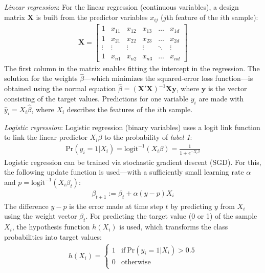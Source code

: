 \documentclass[a4paper,11pt]{article}
\begin{document}
\emph{Linear regression}: For the linear regression (continuous
variables), a design matrix $\mathbf{X}$ is built from the predictor
variables $x_{ij}$ ($j$th feature of the $i$th sample):
\begin{align}
\mathbf{X} = 
\begin{bmatrix}
    1 & x_{11} & x_{12} & x_{13} & \dots  & x_{1d} \\
    1 & x_{21} & x_{22} & x_{23} & \dots  & x_{2d} \\
    \vdots & \vdots & \vdots & \vdots & \ddots & \vdots \\
    1 & x_{n1} & x_{n2} & x_{n3} & \dots  & x_{nd}
\end{bmatrix}
\end{align}
The first column in the matrix enables fitting the intercept in the
regression. The solution for the weights $\hat{\beta}$---which
minimizes the squared-error loss function---is obtained using the
normal equation
$\hat{\beta} = (\mathbf{X}'\mathbf{X})^{-1}\mathbf{X}\mathbf{y}$,
where $\mathbf{y}$ is the vector consisting of the target
values. Predictions for one variable $y_i$ are made with
$\hat{y}_i = X_i\hat{\beta}$, where $X_i$ describes the features of
the $i$th sample.

\emph{Logistic regression}: Logistic regression (binary variables)
uses a logit link function to link the linear predictor $X_i\beta$ to
the probability of \emph{label 1}:
\begin{align}
  \text{Pr}(y_i = 1 | X_i) = \text{logit}^{-1}(X_i\beta) = \frac{1}{1 + e^{-X_i\beta}}
\end{align}
Logistic regression can be trained via stochastic gradient descent
(SGD). For this, the following update function is used---with a
sufficiently small learning rate $\alpha$ and
$p = \text{logit}^{-1}(X_i\beta_t)$:
\begin{align}
  \beta_{t+1} := \beta_{t} + \alpha (y-p)X_i
\end{align}
The difference $y - p$ is the error made at time step $t$ by predicting
$y$ from $X_i$ using the weight vector $\beta_{t}$.
For predicting the target value (0 or 1) of the sample $X_i$, the
hypothesis function $h(X_i)$ is used, which transforms the class
probabilities into target values:
\begin{align}
h (X_i) = 
\begin{cases}
1 & \text{if}~\text{Pr}(y_i = 1 | X_i) > 0.5\\
0 & \text{otherwise}\\
\end{cases}
\end{align}
\end{document}
